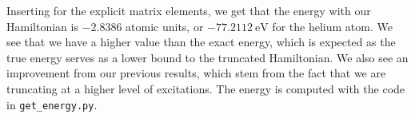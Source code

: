 

Inserting for the explicit matrix elements, we get that the energy with our Hamiltonian is $-2.8386$ atomic units, or $-77.2112 \ \text{eV}$ for the helium atom.
We see that we have a higher value than the exact energy, which is expected as the true energy serves as a lower bound to the truncated Hamiltonian.
We also see an improvement from our previous results, which stem from the fact that we are truncating at a higher level of excitations.
The energy is computed with the code in \verb|get_energy.py|.
